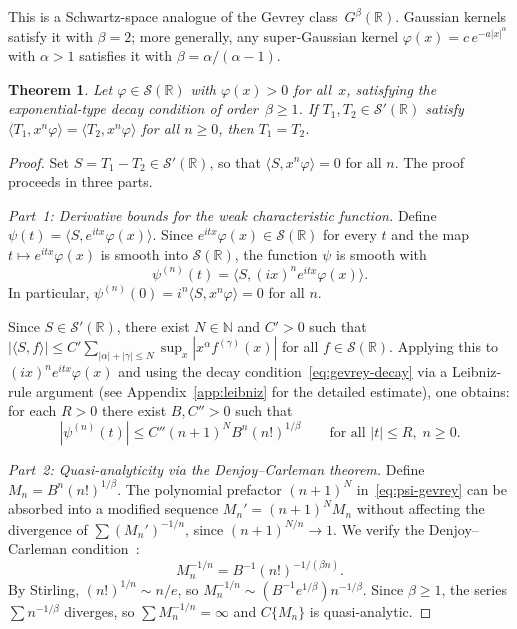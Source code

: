 \documentclass[12pt]{article}
\newtheorem{theorem}{Theorem}[section]
\theoremstyle{definition}
\newcommand{\R}{\mathbb{R}}
\newcommand{\N}{\mathbb{N}}
\begin{document}
This is a Schwartz-space analogue of the Gevrey class~$G^\beta(\R)$.
Gaussian kernels satisfy it with $\beta = 2$; more generally, any
super-Gaussian kernel $\varphi(x) = c\,e^{-a|x|^\alpha}$ with
$\alpha > 1$ satisfies it with $\beta = \alpha/(\alpha - 1)$.

\begin{theorem}\label{thm:dc-unique}
Let $\varphi \in \mathcal{S}(\R)$ with $\varphi(x) > 0$ for all~$x$,
satisfying the exponential-type decay condition of order~$\beta \geq 1$.  If
$T_1, T_2 \in \mathcal{S}'(\R)$ satisfy
$\langle T_1, x^n\varphi\rangle = \langle T_2, x^n\varphi\rangle$
for all $n \geq 0$, then $T_1 = T_2$.
\end{theorem}

\begin{proof}
Set $S = T_1 - T_2 \in \mathcal{S}'(\R)$, so that $\langle S, x^n\varphi\rangle = 0$ for all $n$.  The proof proceeds in three parts.

\medskip
\noindent\textit{Part~1: Derivative bounds for the weak characteristic function.}
Define $\psi(t) = \langle S, e^{itx}\varphi(x)\rangle$.  Since $e^{itx}\varphi(x) \in \mathcal{S}(\R)$ for every $t$ and the map $t \mapsto e^{itx}\varphi(x)$ is smooth into $\mathcal{S}(\R)$, the function $\psi$ is smooth with
\[
  \psi^{(n)}(t) = \langle S, (ix)^n e^{itx}\varphi(x)\rangle.
\]
In particular, $\psi^{(n)}(0) = i^n\langle S, x^n\varphi\rangle = 0$ for all $n$.

Since $S \in \mathcal{S}'(\R)$, there exist $N \in \N$ and $C' > 0$ such that $|\langle S, f\rangle| \leq C'\sum_{|\alpha|+|\gamma|\le N}\sup_x |x^\alpha f^{(\gamma)}(x)|$ for all $f \in \mathcal{S}(\R)$.  Applying this to $(ix)^n e^{itx}\varphi(x)$ and using the decay condition~\eqref{eq:gevrey-decay} via a Leibniz-rule argument (see Appendix~\ref{app:leibniz} for the detailed estimate), one obtains: for each $R > 0$ there exist $B, C'' > 0$ such that
\begin{equation}\label{eq:psi-gevrey}
  |\psi^{(n)}(t)|
  \leq C'' (n+1)^N B^n (n!)^{1/\beta}
  \qquad \text{for all } |t| \leq R,\; n \geq 0.
\end{equation}

\medskip
\noindent\textit{Part~2: Quasi-analyticity via the Denjoy--Carleman theorem.}
Define $M_n = B^n(n!)^{1/\beta}$.  The polynomial prefactor $(n+1)^N$ in~\eqref{eq:psi-gevrey} can be absorbed into a modified sequence $M_n' = (n+1)^N M_n$ without affecting the divergence of $\sum (M_n')^{-1/n}$, since $(n+1)^{N/n}\to 1$.  We verify the Denjoy--Carleman condition~\cite[Thm.~1.3.8]{Hormander1990}:
\[
  M_n^{-1/n} = B^{-1}(n!)^{-1/(\beta n)}.
\]
By Stirling, $(n!)^{1/n}\sim n/e$, so $M_n^{-1/n}\sim (B^{-1}e^{1/\beta})n^{-1/\beta}$.  Since $\beta \geq 1$, the series $\sum n^{-1/\beta}$ diverges, so $\sum M_n^{-1/n}=\infty$ and $C\{M_n\}$ is quasi-analytic.


\end{proof}
\end{document}
